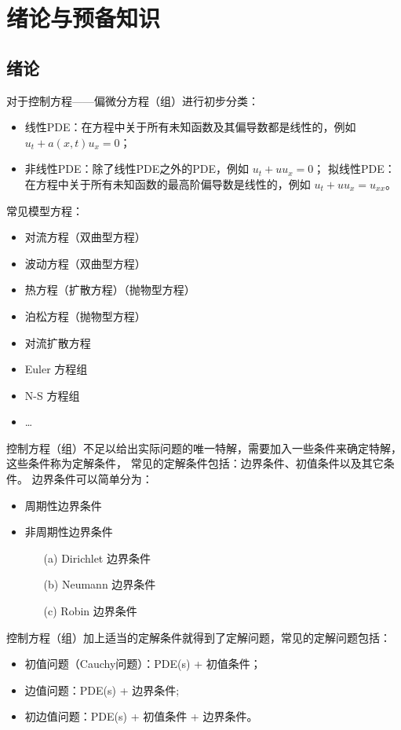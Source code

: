 \chapter{绪论与预备知识}


\section{绪论}


对于控制方程——偏微分方程（组）进行初步分类：
\begin{itemize}
    \item 线性PDE：在方程中关于所有未知函数及其偏导数都是线性的，例如 $u_t + a(x,t) u_x = 0$；
    \item 非线性PDE：除了线性PDE之外的PDE，例如 $u_t + u u_x = 0$；
          拟线性PDE：在方程中关于所有未知函数的最高阶偏导数是线性的，例如 $u_t + u u_x = u_{xx}$。
\end{itemize}
常见模型方程：
\begin{itemize}
    \item 对流方程（双曲型方程）
    \item 波动方程（双曲型方程）
    \item 热方程（扩散方程）（抛物型方程）
    \item 泊松方程（抛物型方程）
    \item 对流扩散方程
    \item Euler 方程组
    \item N-S 方程组
    \item \dots
\end{itemize}


控制方程（组）不足以给出实际问题的唯一特解，需要加入一些条件来确定特解，这些条件称为定解条件，
常见的定解条件包括：边界条件、初值条件以及其它条件。
边界条件可以简单分为：
\begin{itemize}
    \item 周期性边界条件
    \item 非周期性边界条件
          \begin{itemize}
              \item[(a)] Dirichlet 边界条件
              \item[(b)] Neumann 边界条件
              \item[(c)] Robin 边界条件
          \end{itemize}
\end{itemize}
控制方程（组）加上适当的定解条件就得到了定解问题，常见的定解问题包括：
\begin{itemize}
    \item 初值问题（Cauchy问题）：PDE(s) + 初值条件；
    \item 边值问题：PDE(s) + 边界条件;
    \item 初边值问题：PDE(s) + 初值条件 + 边界条件。
\end{itemize}


